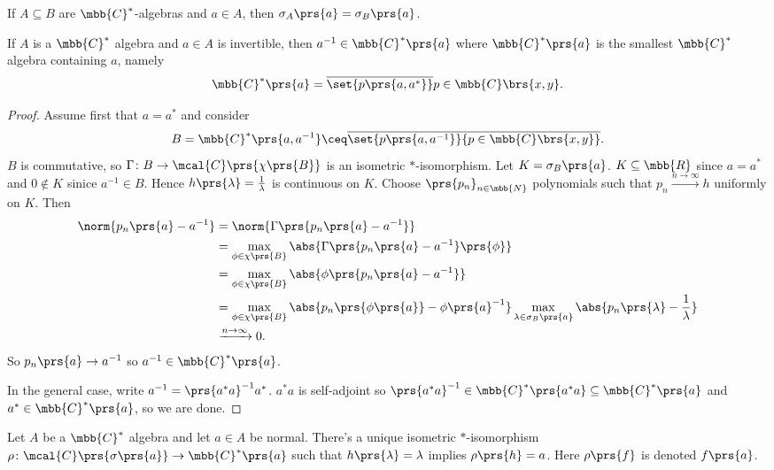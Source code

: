 \documentclass[10pt, twoside]{book}
\begin{document}
\begin{theorem}
If $A \subseteq B$ are $\mbb{C}^*$-algebras and $a \in A$, then $\sigma_A\prs{a} = \sigma_B\prs{a}$.
\end{theorem}

\begin{proposition}
If $A$ is a $\mbb{C}^*$ algebra and $a \in A$ is invertible, then $a^{-1} \in \mbb{C}^*\prs{a}$ where $\mbb{C}^*\prs{a}$ is the smallest $\mbb{C}^*$ algebra containing $a$, namely
\[\mbb{C}^*\prs{a} = \overline{\set{p\prs{a, a^*}}}{p \in \mbb{C}\brs{x,y}} \text{.}\]
\end{proposition}

\begin{proof}
Assume first that $a = a^*$ and consider \[B = \mbb{C}^*\prs{a, a^{-1}} \ceq \overline{\set{p\prs{a,a^{-1}}}{p \in \mbb{C}\brs{x,y}}} \text{.}\]
$B$ is commutative, so $\Gamma \colon B \to \mcal{C}\prs{\chi\prs{B}}$ is an isometric $*$-isomorphism. Let $K = \sigma_B\prs{a}$. $K \subseteq \mbb{R}$ since $a = a^*$ and $0 \notin K$ sinice $a^{-1} \in B$. Hence $h\prs{\lambda} = \frac{1}{\lambda}$ is continuous on $K$.
Choose $\prs{p_n}_{n \in \mbb{N}}$ polynomials such that $p_n \xrightarrow{n\to\infty} h$ uniformly on $K$. Then
\begin{align*}
\norm{p_n\prs{a} - a^{-1}} &= \norm{\Gamma\prs{p_n\prs{a} - a^{-1}}}
\\&= \max_{\phi \in \chi\prs{B}} \abs{\Gamma\prs{p_n\prs{a} - a^{-1}}\prs{\phi}}
\\&= \max_{\phi \in \chi\prs{B}} \abs{\phi\prs{p_n\prs{a} - a^{-1}}}
\\&= \max_{\phi \in \chi\prs{B}} \abs{p_n\prs{\phi\prs{a}} - \phi\prs{a}^{-1}}
\max_{\lambda \in \sigma_B\prs{a}} \abs{p_n\prs{\lambda} - \frac{1}{\lambda}}
\\&\xrightarrow{n\to\infty} 0
\text{.}
\end{align*}
So $p_n\prs{a} \to a^{-1}$ so $a^{-1} \in \mbb{C}^*\prs{a}$.

In the general case, write $a^{-1} = \prs{a^* a}^{-1} a^*$. $a^* a$ is self-adjoint so $\prs{a^* a}^{-1} \in \mbb{C}^*\prs{a^* a} \subseteq \mbb{C}^*\prs{a}$ and $a^* \in \mbb{C}^*\prs{a}$, so we are done.
\end{proof}

\begin{theorem}
Let $A$ be a $\mbb{C}^*$ algebra and let $a \in A$ be normal. There's a unique isometric $*$-isomorphism $\rho \colon \mcal{C}\prs{\sigma\prs{a}} \to \mbb{C}^*\prs{a}$ such that $h\prs{\lambda} = \lambda$ implies $\rho\prs{h} = a$. Here $\rho\prs{f}$ is denoted $f\prs{a}$.
\end{theorem}
\end{document}
